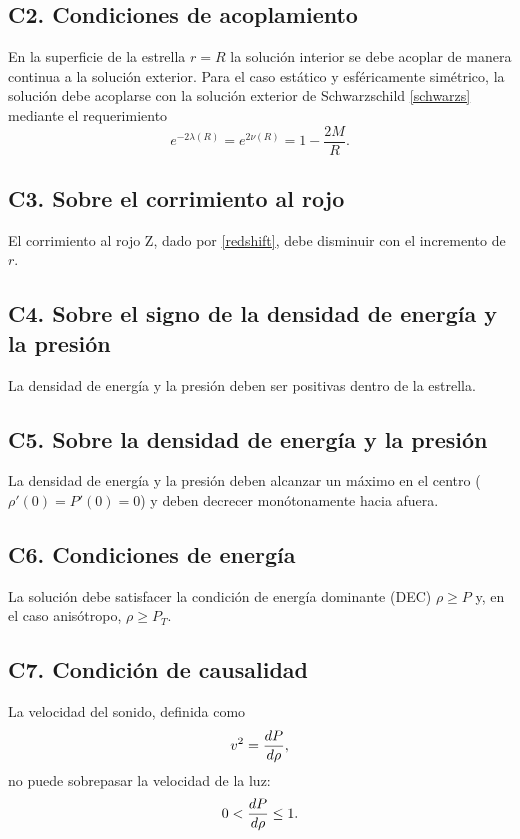 \subsection*{C2. Condiciones de acoplamiento}
En la superficie de la estrella $r=R$ la solución interior se debe acoplar de manera continua a la solución exterior. Para el caso estático y esféricamente simétrico, la solución debe acoplarse con la solución exterior de Schwarzschild \eqref{schwarzs} mediante el requerimiento
\begin{equation}
     e ^ { -2 \lambda(R) } =  e ^ {  2 \nu(R) } =  1 - \frac { 2 M } { R }.
\end{equation}

\subsection*{C3. Sobre el corrimiento al rojo}
El corrimiento al rojo Z, dado por \eqref{redshift}, debe disminuir con el incremento de $r$.

\subsection*{C4. Sobre el signo de la densidad de energía y la presión}
La densidad de energía y la presión deben ser positivas dentro de la estrella.

\subsection*{C5. Sobre la densidad de energía y la presión}
La densidad de energía y la presión deben alcanzar un máximo en el centro ($\rho'(0)=P'(0)=0$) y deben decrecer monótonamente hacia afuera.

\subsection*{C6. Condiciones de energía}
La solución debe satisfacer la condición de energía dominante (DEC) $\rho \geq P$ y, en el caso anisótropo, $\rho \geq P_{T}$.

\subsection*{C7. Condición de causalidad}
La velocidad del sonido, definida como
\begin{equation}
    v^2=\dv{P}{\rho},
\end{equation}
no puede sobrepasar la velocidad de la luz:
\begin{equation}
    0 < \dv{P}{\rho} \leq 1 .
\end{equation}


